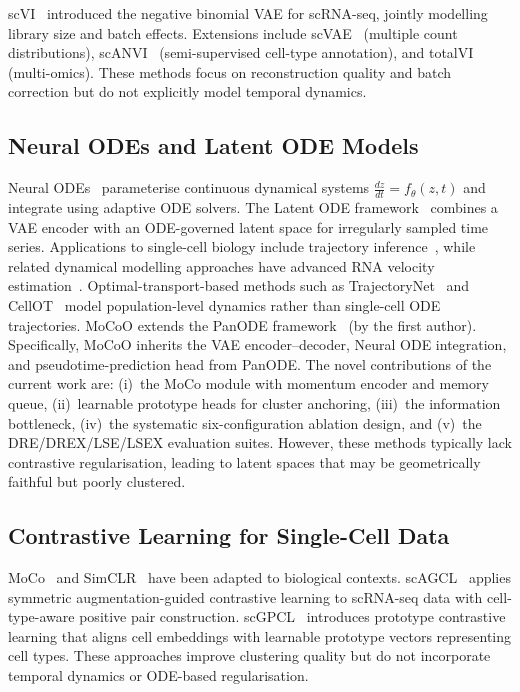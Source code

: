 \documentclass[preprint,12pt,number]{elsarticle}
\begin{document}
scVI~\cite{lopez2018deep} introduced the negative binomial VAE for scRNA-seq, jointly modelling library size and batch effects. Extensions include scVAE~\cite{gronbech2020scvae} (multiple count distributions), scANVI~\cite{xu2021probabilistic} (semi-supervised cell-type annotation), and totalVI~\cite{gayoso2021joint} (multi-omics). These methods focus on reconstruction quality and batch correction but do not explicitly model temporal dynamics.

\subsection{Neural ODEs and Latent ODE Models}
\label{sec:related:ode}

Neural ODEs~\cite{chen2018neural} parameterise continuous dynamical systems $\frac{dz}{dt} = f_\theta(z, t)$ and integrate using adaptive ODE solvers. The Latent ODE framework~\cite{rubanova2019latent} combines a VAE encoder with an ODE-governed latent space for irregularly sampled time series. Applications to single-cell biology include trajectory inference~\cite{fu2025panode}, while related dynamical modelling approaches have advanced RNA velocity estimation~\cite{bergen2020generalizing}. Optimal-transport-based methods such as TrajectoryNet~\cite{tong2020trajectorynet} and CellOT~\cite{bunne2022cellot} model population-level dynamics rather than single-cell ODE trajectories. MoCoO extends the PanODE framework~\cite{fu2025panode} (by the first author). Specifically, MoCoO inherits the VAE encoder--decoder, Neural ODE integration, and pseudotime-prediction head from PanODE. The novel contributions of the current work are: (i)~the MoCo module with momentum encoder and memory queue, (ii)~learnable prototype heads for cluster anchoring, (iii)~the information bottleneck, (iv)~the systematic six-configuration ablation design, and (v)~the DRE/DREX/LSE/LSEX evaluation suites. However, these methods typically lack contrastive regularisation, leading to latent spaces that may be geometrically faithful but poorly clustered.

\subsection{Contrastive Learning for Single-Cell Data}
\label{sec:related:contrastive}

MoCo~\cite{he2020momentum} and SimCLR~\cite{chen2020simple} have been adapted to biological contexts. scAGCL~\cite{cai2024scagcl} applies symmetric augmentation-guided contrastive learning to scRNA-seq data with cell-type-aware positive pair construction. scGPCL~\cite{cai2024scgpcl} introduces prototype contrastive learning that aligns cell embeddings with learnable prototype vectors representing cell types. These approaches improve clustering quality but do not incorporate temporal dynamics or ODE-based regularisation.
\end{document}
